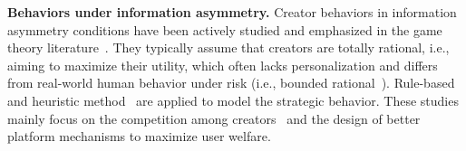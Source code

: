 





\textbf{Behaviors under information asymmetry.} Creator behaviors in information asymmetry conditions
have been actively studied and emphasized in the game theory literature~\cite{yao2024uwo, lin2024cfd, xu2024ppa}. 
They typically assume that creators are totally rational, i.e., aiming to maximize their utility, which often lacks personalization and differs from real-world human behavior under risk (i.e., bounded rational~\cite{selten1990bounded_rationality}). Rule-based~\cite{xu2024ppa} and heuristic method~\cite{yao2024uwo, lin2024cfd} are applied to model the strategic behavior. These studies mainly focus on the competition among creators~\cite{yao2024uwo,lin2024cfd} and the design of better platform mechanisms\cite{mladenov2020optimizing_long-term,prasad2023contentprompting} to maximize user welfare.



